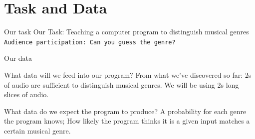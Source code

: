 \documentclass[aspectratio=169]{beamer}
\begin{document}
\section{Task and Data}
	\begin{frame}{Our task}
		Our Task: Teaching a computer program to distinguish musical genres
		\vfill
		\texttt{Audience participation: Can you guess the genre?}
		\vfill
	\end{frame}

	\begin{frame}{Our data}
		\begin{block}{What data will we feed into our program?}
			From what we've discovered so far: 2s of audio are sufficient to distinguish musical genres.
			We will be using 2s long slices of audio.
		\end{block}

		\bigskip

		\begin{block}{What data do we expect the program to produce?}
			A probability for each genre the program knows; How likely the program thinks it is a given input matches
			a certain musical genre.
		\end{block}

	\end{frame}
\end{document}
